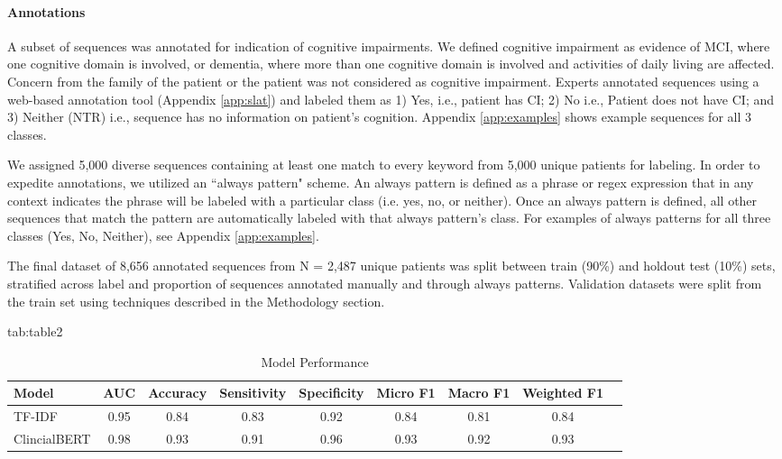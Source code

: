 \documentclass[pmlr,twocolumn,10pt]{jmlr} %
\begin{document}
\paragraph{Annotations}
\label{sec:Annotations} A subset of sequences was annotated for indication of cognitive impairments. We defined cognitive impairment as evidence of MCI, where one cognitive domain is involved, or dementia, where more than one cognitive domain is involved and activities of daily living are affected. Concern from the family of the patient or the patient was not considered as cognitive impairment. Experts annotated sequences using a web-based annotation tool (Appendix \ref{app:slat}) and labeled them as 1) Yes, i.e., patient has CI; 2) No i.e., Patient does not have CI; and 3) Neither (NTR) i.e., sequence has no information on patient’s cognition. Appendix \ref{app:examples} shows example sequences for all 3 classes.

We assigned 5,000 diverse sequences containing at least one match to every keyword from 5,000 unique patients for labeling. In order to expedite annotations, we utilized an “always pattern" scheme. An always pattern is defined as a phrase or regex expression that in any context indicates the phrase will be labeled with a particular class (i.e. yes, no, or neither). Once an always pattern is defined, all other sequences that match the pattern are automatically labeled with that always pattern's class. For examples of always patterns for all three classes (Yes, No, Neither), see Appendix \ref{app:examples}. 

The final dataset of 8,656 annotated sequences from N = 2,487 unique patients was split between train (90\%) and holdout test (10\%) sets, stratified across label and proportion of sequences annotated manually and through always patterns. Validation datasets were split from the train set using techniques described in the Methodology section. 

\begin{table*}[hbtp]
\floatconts
{tab:table2}
{\caption{Model Performance}}
\centering
  {
  \begin{tabular}{lcccccccc}
    \toprule 
    \bfseries Model & \bfseries AUC & \bfseries Accuracy & \bfseries Sensitivity & \bfseries Specificity & \bfseries Micro F1  & \bfseries Macro F1 & \bfseries Weighted F1 \\ 
    \midrule
    TF-IDF & 0.95 & 0.84 & 0.83 & 0.92 & 0.84 & 0.81 & 0.84 \\
    ClincialBERT & 0.98 & 0.93 & 0.91 & 0.96 & 0.93 & 0.92 & 0.93 \\
    \bottomrule
  \end{tabular}
  }

  \label{tab:modelperf}
\end{table*}
\end{document}
